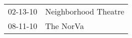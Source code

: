\begin{supertabular}{p{0.25\columnwidth}p{0.75\columnwidth}}
 02-13-10 &  Neighborhood Theatre \\
 08-11-10 &             The NorVa \\
\end{supertabular}
